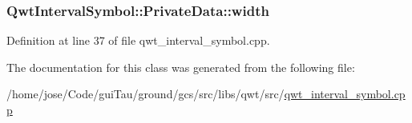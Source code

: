 \hypertarget{class_qwt_interval_symbol_1_1_private_data_ae94036f9ff3305149478415c429a6899}{
\subsubsection[{width}]{ Qwt\-Interval\-Symbol\-::\-Private\-Data\-::width}}\label{class_qwt_interval_symbol_1_1_private_data_ae94036f9ff3305149478415c429a6899}


Definition at line 37 of file qwt\-\_\-interval\-\_\-symbol.\-cpp.



The documentation for this class was generated from the following file\-:\begin{DoxyCompactItemize}
\item 
/home/jose/\-Code/gui\-Tau/ground/gcs/src/libs/qwt/src/\hyperlink{qwt__interval__symbol_8cpp}{qwt\-\_\-interval\-\_\-symbol.\-cpp}\end{DoxyCompactItemize}
